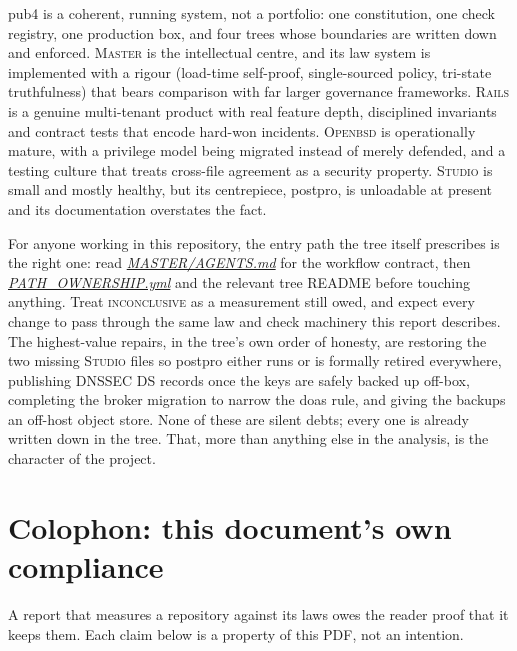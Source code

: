 \documentclass[oneside]{article}
\newcommand{\treename}[1]{\mbox{\textsc{#1}}}
\newcommand{\mtree}{\treename{Master}}
\newcommand{\rtree}{\treename{Rails}}
\newcommand{\stree}{\treename{Studio}}
\newcommand{\otree}{\treename{Openbsd}}
\newcommand{\fpath}[1]{\emph{\url{#1}}}
\begin{document}
pub4 is a coherent, running system, not a portfolio: one constitution, one check registry, one production box, and four trees whose boundaries are written down and enforced. \mtree{} is the intellectual centre, and its law system is implemented with a rigour (load-time self-proof, single-sourced policy, tri-state truthfulness) that bears comparison with far larger governance frameworks. \rtree{} is a genuine multi-tenant product with real feature depth, disciplined invariants and contract tests that encode hard-won incidents. \otree{} is operationally mature, with a privilege model being migrated instead of merely defended, and a testing culture that treats cross-file agreement as a security property. \stree{} is small and mostly healthy, but its centrepiece, postpro, is unloadable at present and its documentation overstates the fact.

For anyone working in this repository, the entry path the tree itself prescribes is the right one: read \fpath{MASTER/AGENTS.md} for the workflow contract, then \fpath{PATH_OWNERSHIP.yml} and the relevant tree README before touching anything. Treat \textsc{inconclusive} as a measurement still owed, and expect every change to pass through the same law and check machinery this report describes. The highest-value repairs, in the tree's own order of honesty, are restoring the two missing \stree{} files so postpro either runs or is formally retired everywhere, publishing DNSSEC DS records once the keys are safely backed up off-box, completing the broker migration to narrow the doas rule, and giving the backups an off-host object store. None of these are silent debts; every one is already written down in the tree. That, more than anything else in the analysis, is the character of the project.

\section*{Colophon: this document's own compliance}

A report that measures a repository against its laws owes the reader proof that it keeps them. Each claim below is a property of this PDF, not an intention.
\end{document}
